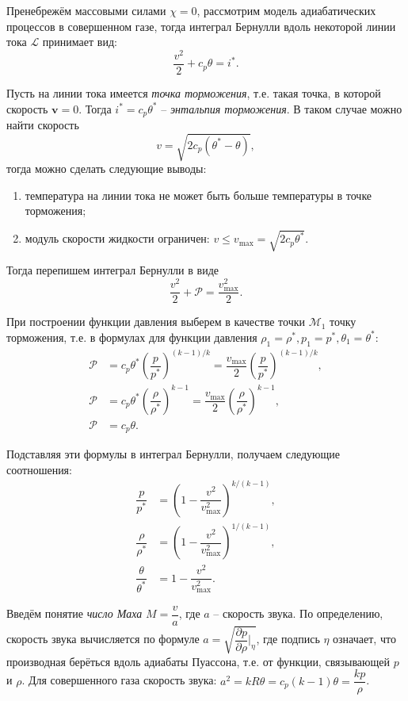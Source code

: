 
Пренебрежём массовыми силами $\chi = 0$, рассмотрим модель адиабатических процессов в совершенном
газе, тогда интеграл Бернулли вдоль некоторой линии тока $\mathcal{L}$ принимает вид:
\[
  \dfrac{v^2}{2} + c_p \theta = i^*.
\]

Пусть на линии тока имеется \emph{точка торможения}, т.е. такая точка, в которой скорость 
$\mathbf{v} = 0$. Тогда $i^* = c_p \theta^*$ -- \emph{энтальпия торможения}. В таком случае
можно найти скорость
\[
  v = \sqrt{2 c_p (\theta^* - \theta)},
\]
тогда можно сделать следующие выводы:
\begin{enumerate}
  \item температура на линии тока не может быть больше температуры в точке торможения;
  \item модуль скорости жидкости ограничен: $v \leqslant v_{\max} = \sqrt{2 c_p \theta^*}$.
\end{enumerate}

Тогда перепишем интеграл Бернулли в виде
\[
  \dfrac{v^2}{2} + \mathcal{P} = \dfrac{v_{\max}^2}{2}.
\]

При построении функции давления выберем в качестве точки $\mathcal{M}_1$ точку торможения,
т.е. в формулах для функции давления $\rho_1 = \rho^*, p_1 = p^*, \theta_1 = \theta^*$:
\begin{align*}
  \mathcal{P} &= c_p \theta^* \left( \dfrac{p}{p^*} \right)^{(k-1) / k} = \dfrac{v_{\max}}{2} \left( \dfrac{p}{p^*} \right)^{(k-1)/k}, \\
  \mathcal{P} &= c_p \theta^* \left( \dfrac{\rho}{\rho^*} \right)^{k-1} = \dfrac{v_{\max}}{2} \left( \dfrac{\rho}{\rho^*} \right)^{k-1}, \\
  \mathcal{P} &= c_p \theta.
\end{align*}

Подставляя эти формулы в интеграл Бернулли, получаем следующие соотношения:
\begin{align*}
  \dfrac{p}{p^*} &= \left( 1 - \dfrac{v^2}{v_{\max}^2} \right)^{k / (k-1)}, \\
  \dfrac{\rho}{\rho^*} &= \left( 1 - \dfrac{v^2}{v_{\max}^2} \right)^{1 / (k-1)}, \\
  \dfrac{\theta}{\theta^*} &= 1 - \dfrac{v^2}{v_{\max}^2}.
\end{align*}

Введём понятие \emph{число Маха} $M = \dfrac{v}{a}$, где $a$ -- скорость звука.
По определению, скорость звука вычисляется по формуле
$a = \sqrt{ \dfrac{\partial p}{\partial \rho} |_{\eta} }$, где подпись $\eta$ означает, что
производная берёться вдоль адиабаты Пуассона, т.е. от функции, связывающей $p$ и $\rho$.
Для совершенного газа скорость звука: $a^2 = k R \theta = c_p (k-1) \theta = \dfrac{kp}{\rho}$.

